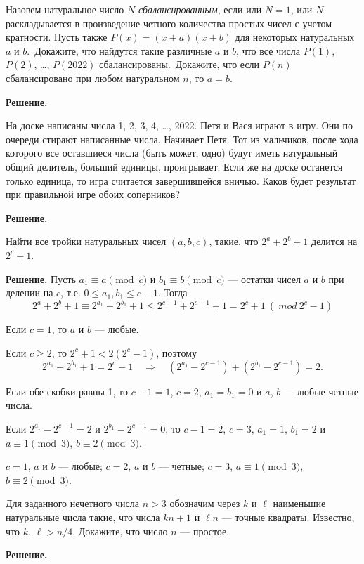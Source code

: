 Назовем натуральное число $N$ \textit{сбалансированным}, если или $N=1$, или $N$ раскладывается в произведение четного количества простых чисел с учетом кратности. Пусть также $P(x)=(x+a)(x+b)$ для некоторых натуральных $a$ и $b$.\ Докажите, что найдутся такие различные $a$ и $b$, что все числа $P(1)$, $P(2)$, …, $P(2022)$ сбалансированы.\ Докажите, что если $P(n)$ сбалансировано при любом натуральном $n$, то $a = b$.

\textbf{Решение.}


\newpage

\hspace{3mm}

На доске написаны числа 1, 2, 3, 4, …, 2022. Петя и Вася играют в игру. Они по очереди стирают написанные числа. Начинает Петя. Тот из мальчиков, после хода которого все оставшиеся числа (быть может, одно) будут иметь натуральный общий делитель, больший единицы, проигрывает. Если же на доске останется только единица, то игра считается завершившейся вничью. Каков будет результат при правильной игре обоих соперников?

\textbf{Решение.}


Найти все тройки натуральных чисел $(a,b,c)$, такие, что $2^a+2^b+1$ делится на $2^c+1$.

\textbf{Решение.}
Пусть $a_1\equiv a\pmod{c}$ и $b_1\equiv b\pmod{c}$ — остатки чисел $a$ и $b$ при делении на $c$, т.е. $0\leqslant a_1,b_1\leqslant c-1$. Тогда 
$$2^a+2^b+1\equiv 2^{a_1}+2^{b_1}+1\leqslant 2^{c-1}+2^{c-1}+1=2^c+1 \ (\ mod\ 2^c - 1)$$

Если $c = 1$, то $a$ и $b$ — любые.

Если $c\geqslant 2$, то $2^c+1<2(2^c-1)$, поэтому
$$2^{a_1}+2^{b_1}+1=2^c-1\quad\Rightarrow\quad (2^{a_1}-2^{c-1})+(2^{b_1}-2^{c-1})=2.$$

Если обе скобки равны 1, то $c-1=1$, $c=2$, $a_1=b_1=0$ и $a$, $b$ —
любые четные числа.

Если $2^{a_1}-2^{c-1}=2$ и $2^{b_1}-2^{c-1}=0$, то $c-1=2$, $c=3$,
$a_1=1$, $b_1=2$ и $a\equiv 1\pmod{3}$, $b\equiv 2\pmod{3}$.

$c=1$, $a$ и $b$ — любые; $c=2$, $a$ и $b$ — четные; $c=3$,
$a\equiv 1\pmod{3}$, $b\equiv 2\pmod{3}$.

Для заданного нечетного числа $n>3$ обозначим через $k$ и $\ell$ наименьшие натуральные числа такие, что числа $kn+1$ и $\ell n$ — точные квадраты. Известно, что $k$, $\ell > n/4$. Докажите, что число $n$ --- простое.

\textbf{Решение.}
